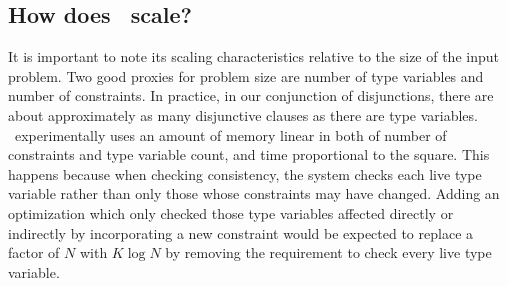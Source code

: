 \subsection{How does \bitr\ scale?}
\label{subsec:speed}
It is important to note its scaling characteristics relative to the size of the input problem. Two good proxies for problem size are number of type variables and number of constraints. In practice, in our conjunction of disjunctions, there are about approximately as many disjunctive clauses as there are type variables. \bitr\ experimentally uses an amount of memory linear in both of number of constraints and type variable count, and time proportional to the square. This happens because when checking consistency, the system checks each live type variable rather than only those whose constraints may have changed. Adding an optimization which only checked those type variables affected directly or indirectly by incorporating a new constraint would be expected to replace a factor of $N$ with $K \log N$ by removing the requirement to check every live type variable.
